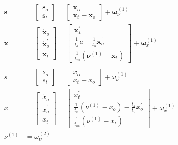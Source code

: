 \documentclass[a4paper]{article} %
\begin{document}
\begin{align}
\bm{s} &=  \left[\begin{array}{c} \bm{s}_o \\ \bm{s}_t \end{array}\right] =  \left[\begin{array}{c} \bm{x}_o \\  \bm{x}_t - \bm{x}_o \end{array}\right] + \bm{\omega}^{(1)}_\nu \nonumber \\%
\bm{\dot{x}} &=  \left[\begin{array}{c} \bm{\dot{x}}_o \\ \bm{\dot{x}}^{\prime}_o \\ \bm{\dot{x}}_t \end{array}\right] =  \left[\begin{array}{c} \bm{x}^{\prime}_t \\ \frac{1}{t_a} a-\frac{1}{t_o}\bm{x}^{\prime}_o \\  \frac{1}{t_m}(\bm{\nu}^{(1)} -  \bm{x}_t) \end{array}\right] + \bm{\omega}^{(1)}_x \nonumber \\%
 \label{eq:9} \\%
s &=  \left[\begin{array}{c} s_o \\ s_t \end{array}\right] =  \left[\begin{array}{c} x_o \\  x_t - x_o \end{array}\right] + \omega^{(1)}_\nu \nonumber \\%
\dot{x} &=  \left[\begin{array}{c} \dot{x}_o \\ \dot{x}^{\prime}_o \\ \dot{x}_t \end{array}\right] =  \left[\begin{array}{c} {x}^{\prime}_t \\ \frac{1}{t_v}(\nu^{(1)}-x_o) - \frac{t_s}{t_v}{x}^{\prime}_o \\  \frac{1}{t_m}(\nu^{(1)} -  x_t)\end{array}\right] + \omega^{(1)}_x \nonumber \\  %
\nu^{(1)} &= \omega^{(2)}_\nu \nonumber %
\end{align}%
\end{document}
